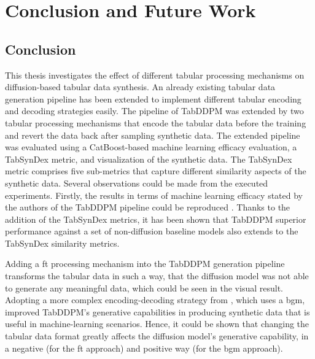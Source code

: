 \chapter{Conclusion and Future Work}
\label{ch:conclusion}

\section{Conclusion}
\label{ch:conclusion_}

This thesis investigates the effect of different tabular processing mechanisms on diffusion-based tabular data synthesis.
An already existing tabular data generation pipeline has been extended to implement different tabular encoding and decoding strategies easily.
The pipeline of TabDDPM \cite{kotelnikov2022TabDDPMModellingTabular} was extended by two tabular processing mechanisms that encode the tabular data before the training and revert the data back after sampling synthetic data.
The extended pipeline was evaluated using a CatBoost-based machine learning efficacy evaluation, a TabSynDex metric, and visualization of the synthetic data.
The TabSynDex metric comprises five sub-metrics that capture different similarity aspects of the synthetic data.
Several observations could be made from the executed experiments.
Firstly, the results in terms of machine learning efficacy stated by the authors of the TabDDPM pipeline could be reproduced \cite{kotelnikov2022TabDDPMModellingTabular}.
Thanks to the addition of the TabSynDex metrics, it has been shown that TabDDPM superior performance against a set of non-diffusion baseline \glspl{model} also extends to the TabSynDex similarity metrics.

Adding a \acrfull{ft} processing mechanism into the TabDDPM generation pipeline transforms the tabular data in such a way,
that the diffusion \gls{model} was not able to generate any meaningful data, which could be seen in the visual result.
Adopting a more complex encoding-decoding strategy from \cite{zhao2022CTABGANEnhancingTabular}, which uses a \acrfull{bgm},
improved TabDDPM's generative capabilities in producing synthetic data that is useful in machine-learning scenarios.
Hence, it could be shown that changing the tabular data format greatly affects the diffusion \gls{model}'s generative capability, in a negative (for the \gls{ft} approach) and positive way (for the \gls{bgm} approach).

